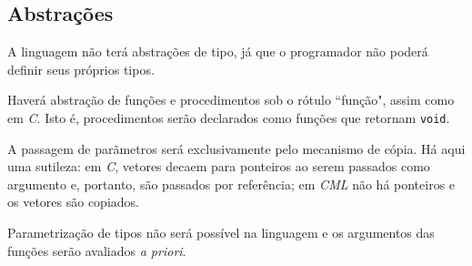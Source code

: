 \documentclass[12pt]{article}
\begin{document}
\subsection{Abstrações}
A linguagem não terá abstrações de tipo, já que o programador não poderá definir seus próprios tipos.

Haverá abstração de funções e procedimentos sob o rótulo ``função", assim como em {\it C}. Isto é, procedimentos serão declarados como funções que retornam {\tt void}.

A passagem de parãmetros será exclusivamente pelo mecanismo de cópia. Há aqui uma sutileza: em {\it C}, vetores decaem para ponteiros ao serem passados como argumento e, portanto, são passados por referência; em {\it CML} não há ponteiros e os vetores são copiados.

Parametrização de tipos não será possível na linguagem e os argumentos das funções serão avaliados {\it a priori}.
\end{document}
